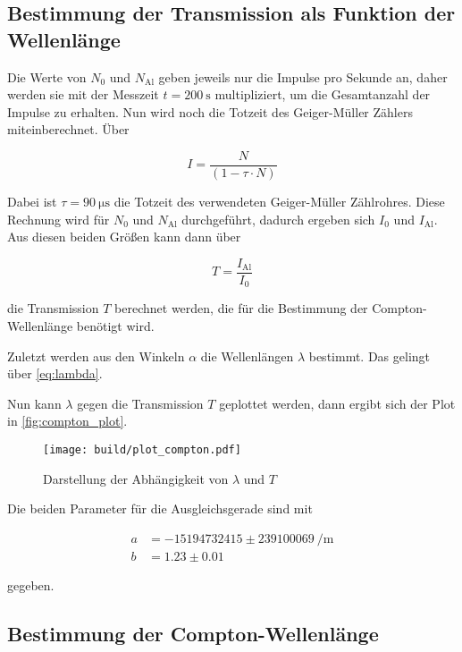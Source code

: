 \subsection{Bestimmung der Transmission als Funktion der Wellenlänge}
\label{ssec:2}

Die Werte von $N_0$ und $N_\text{Al}$ geben jeweils nur die Impulse pro Sekunde an, daher werden sie mit der Messzeit $t = \SI{200}{\second}$ multipliziert, um die Gesamtanzahl der Impulse zu erhalten.
Nun wird noch die Totzeit des Geiger-Müller Zählers miteinberechnet. 
Über 

\begin{equation}
    I = \frac{N}{\left(1 - \tau \cdot N\right)}
    \label{eq:totzeit}
\end{equation}

Dabei ist $\tau = \SI{90}{\micro\second}$ die Totzeit des verwendeten Geiger-Müller Zählrohres.
Diese Rechnung wird für $N_0$ und $N_\text{Al}$ durchgeführt, dadurch ergeben sich $I_0$ und $I_\text{Al}$.
Aus diesen beiden Größen kann dann über 

\begin{equation}
    T = \frac{I_\text{Al}}{I_0}
\end{equation}

die Transmission $T$ berechnet werden, die für die Bestimmung der Compton-Wellenlänge benötigt wird.

Zuletzt werden aus den Winkeln $\alpha$ die Wellenlängen $\lambda$ bestimmt.
Das gelingt über \eqref{eq:lambda}.

Nun kann $\lambda$ gegen die Transmission $T$ geplottet werden, dann ergibt sich der Plot in \autoref{fig:compton_plot}.

\begin{figure}
    \centering
    \texttt{[image: build/plot\_compton.pdf]}
    \caption{Darstellung der Abhängigkeit von $\lambda$ und $T$}
    \label{fig:compton_plot}
\end{figure}

Die beiden Parameter für die Ausgleichsgerade sind mit 

\begin{align}
    a &= -15194732415 \pm \SI{239100069}{\per\meter} \label{eq:parameter1} \\
    b &= 1.23 \pm 0.01 \label{eq:parameter2}  
\end{align}

gegeben.

\subsection{Bestimmung der Compton-Wellenlänge}
\label{ssec:c}


